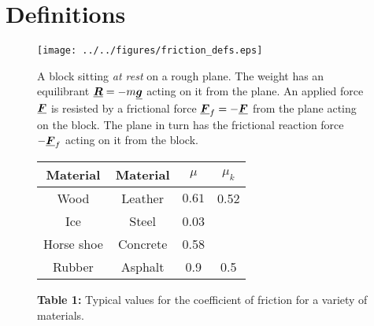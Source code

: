 




\addtolength{\topmargin}{-0.7 cm}
\setlength{\columnsep}{22pt}


\section{Definitions}
\begin{wrapfigure}{r}{7cm}\vspace{-2cm}
\center
\texttt{[image: ../../figures/friction\_defs.eps]}
\caption{A block sitting \textit{at rest }on a rough plane.  The weight has an equilibrant $\mathit{\underline{\boldsymbol{R}}} = - m\mathit{\underline{\boldsymbol{g}}}$ acting on it from the plane.  An applied force $\mathit{\underline{\boldsymbol{F}}}$ is resisted by a frictional force $\mathit{\underline{\boldsymbol{F}}}_f = -\mathit{\underline{\boldsymbol{F}}}$ from the plane acting on the block.  The plane in turn has the frictional reaction force $-\mathit{\underline{\boldsymbol{F}}}_f$ acting on it from the block.}\vspace{1.0cm}
\label{fig:friction-defs}

  \begin{tabular}{|c|c|c|c|}
\hline
Material & Material & $\mu$ & $\mu_k$\\
\hline
\hline
   Wood & Leather &$0.61$& 0.52 \\
   \hline
   Ice & Steel &0.03& \\
    \hline
   Horse shoe   & Concrete &0.58& \\
 \hline
   Rubber & Asphalt &0.9&0.5 \\
   \hline

  \end{tabular}
  \caption*{{\bf Table 1:} Typical values for the coefficient of friction for a variety of materials.}\vspace{-0.7cm}\label{tab:coeffs}
 \end{wrapfigure}


